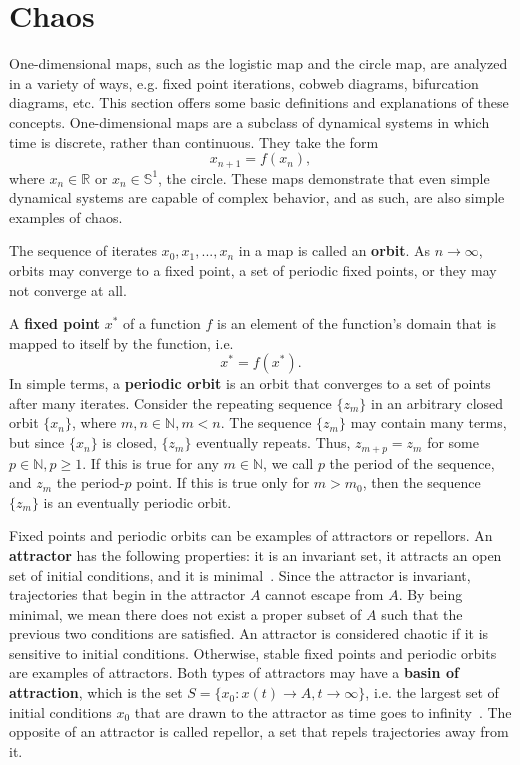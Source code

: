 \section{Chaos}
One-dimensional maps, such as the logistic map and the circle map, are
analyzed in a variety of ways, e.g. fixed point iterations,
cobweb diagrams, bifurcation diagrams, etc. This section offers some
basic definitions and explanations of these concepts. One-dimensional maps are a
subclass of dynamical systems in which time is discrete, rather than
continuous. They take the form
\begin{equation*}
x_{n+1}=f(x_n),
\end{equation*}
where $x_n \in \mathbb{R}$ or $x_n \in \mathbb{S}^1$, the circle. These maps demonstrate that even simple dynamical systems are capable
of complex behavior, and as such, are also simple examples of chaos. 

The sequence of iterates ${x_0,x_1,...,x_n}$ in a map is
called an \textbf{orbit}. As $n \to \infty$, orbits may converge to a fixed point, a
set of periodic fixed points, or they may not converge at all. 

A \textbf{fixed point} $x^*$ of a function $f$ is an element of the
function's domain that is mapped to itself by the function, i.e.
\begin{equation*}
x^* = f(x^*).
\end{equation*}
In simple terms, a \textbf{periodic orbit} is an orbit that converges to a set
of points after many iterates. Consider the repeating sequence $\{z_m\}$
in an arbitrary closed orbit $\{x_n\}$, where $m,n \in \mathbb{N},
m<n$. The sequence $\{z_m\}$ may contain many terms, but since
$\{x_n\}$ is closed, $\{z_m\}$ eventually repeats. Thus, $z_{m+p}=z_m$
for some $p \in \mathbb{N}, p\geq 1$. If this is true for any $m \in
\mathbb{N}$, we call $p$ the period of the sequence, and $z_m$ the
period-$p$ point. If this is true only for $m > m_0$, then the
sequence $\{z_m\}$ is an
eventually periodic orbit.

Fixed points and periodic
orbits can be examples of attractors or repellors. An \textbf{attractor} has the following
properties: it is an invariant set, it attracts an open set of initial
conditions, and it is minimal~\cite{strogatz}. Since the attractor is
invariant, trajectories that begin in the attractor $A$ cannot escape
from $A$. By being minimal, we mean there does not exist a proper
subset of $A$ such that the previous two conditions are
satisfied. An attractor is considered chaotic if it is sensitive to
initial conditions. Otherwise, stable fixed points and periodic orbits are examples of attractors. Both types of attractors may have
a \textbf{basin of attraction}, which is the set $S=\{x_0:x(t) \to A, t \to \infty\}$, i.e.
the largest set of initial conditions $x_0$ that are drawn to the attractor as
time goes to infinity~\cite{strogatz}. The opposite of an attractor is
called repellor, a set that repels trajectories away from it.

